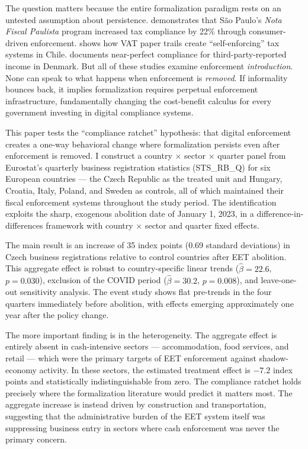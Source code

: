 \documentclass[12pt]{article}
\begin{document}
The question matters because the entire formalization paradigm rests on an untested assumption about persistence. \citet{naritomi2019} demonstrates that São Paulo's \textit{Nota Fiscal Paulista} program increased tax compliance by 22\% through consumer-driven enforcement. \citet{pomeranz2015} shows how VAT paper trails create ``self-enforcing'' tax systems in Chile. \citet{kleven2011} documents near-perfect compliance for third-party-reported income in Denmark. But all of these studies examine enforcement \textit{introduction}. None can speak to what happens when enforcement is \textit{removed}. If informality bounces back, it implies formalization requires perpetual enforcement infrastructure, fundamentally changing the cost-benefit calculus for every government investing in digital compliance systems.

This paper tests the ``compliance ratchet'' hypothesis: that digital enforcement creates a one-way behavioral change where formalization persists even after enforcement is removed. I construct a country $\times$ sector $\times$ quarter panel from Eurostat's quarterly business registration statistics (STS\_RB\_Q) for six European countries --- the Czech Republic as the treated unit and Hungary, Croatia, Italy, Poland, and Sweden as controls, all of which maintained their fiscal enforcement systems throughout the study period. The identification exploits the sharp, exogenous abolition date of January 1, 2023, in a difference-in-differences framework with country $\times$ sector and quarter fixed effects.

The main result is an increase of 35 index points (0.69 standard deviations) in Czech business registrations relative to control countries after EET abolition. This aggregate effect is robust to country-specific linear trends ($\hat{\beta} = 22.6$, $p = 0.030$), exclusion of the COVID period ($\hat{\beta} = 30.2$, $p = 0.008$), and leave-one-out sensitivity analysis. The event study shows flat pre-trends in the four quarters immediately before abolition, with effects emerging approximately one year after the policy change.

The more important finding is in the heterogeneity. The aggregate effect is entirely absent in cash-intensive sectors --- accommodation, food services, and retail --- which were the primary targets of EET enforcement against shadow-economy activity. In these sectors, the estimated treatment effect is $-7.2$ index points and statistically indistinguishable from zero. The compliance ratchet holds precisely where the formalization literature would predict it matters most. The aggregate increase is instead driven by construction and transportation, suggesting that the administrative burden of the EET system itself was suppressing business entry in sectors where cash enforcement was never the primary concern.
\end{document}
